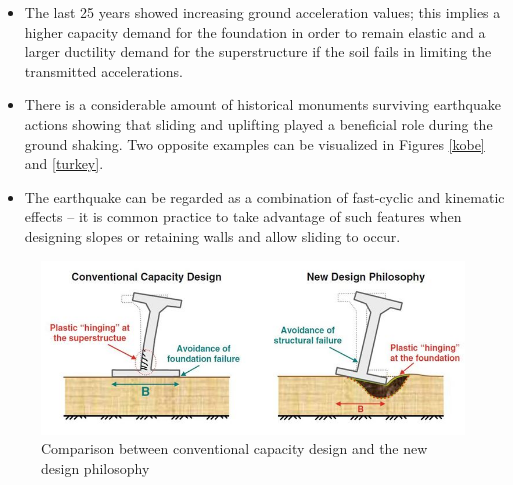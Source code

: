 \documentclass[12pt,a4paper]{report}
\begin{document}
\begin{itemize}
	\item The last 25 years showed increasing ground acceleration values; this implies a higher capacity demand for the foundation in order to remain elastic and a larger ductility demand for the superstructure if the soil fails in limiting the transmitted accelerations.
	\item There is a considerable amount of historical monuments surviving earthquake actions showing that sliding and uplifting played a beneficial role during the ground shaking. Two opposite examples can be visualized in Figures \ref{kobe} and \ref{turkey}.
	\item The earthquake can be regarded as a combination of fast-cyclic and kinematic effects – it is common practice to take advantage of such features when designing slopes or retaining walls and allow sliding to occur.
\end{itemize}

\begin{figure}[h!]
	\centering
	\includegraphics[width=0.9\linewidth]{"new_phil"}
	\caption{Comparison between conventional capacity design and the new design philosophy}
	\label{comp}
\end{figure}
\end{document}

